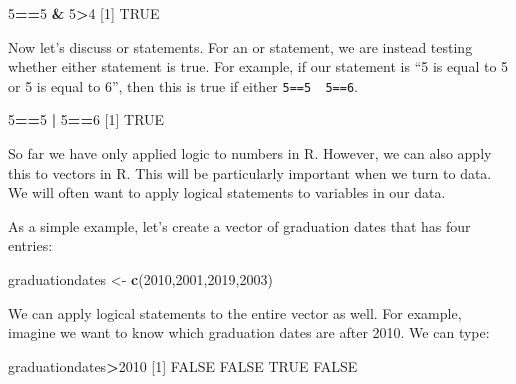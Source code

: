 \documentclass[
]{book}
\newenvironment{Shaded}{\begin{snugshade}}{\end{snugshade}}
\newcommand{\ConstantTok}[1]{\textcolor[rgb]{0.56,0.35,0.01}{#1}}
\newcommand{\DecValTok}[1]{\textcolor[rgb]{0.00,0.00,0.81}{#1}}
\newcommand{\FunctionTok}[1]{\textcolor[rgb]{0.13,0.29,0.53}{\textbf{#1}}}
\newcommand{\NormalTok}[1]{#1}
\newcommand{\OtherTok}[1]{\textcolor[rgb]{0.56,0.35,0.01}{#1}}
\newcommand{\SpecialCharTok}[1]{\textcolor[rgb]{0.81,0.36,0.00}{\textbf{#1}}}
\begin{document}
\begin{Shaded}
\begin{Highlighting}[]
\DecValTok{5}\SpecialCharTok{==}\DecValTok{5} \SpecialCharTok{\&} \DecValTok{5}\SpecialCharTok{\textgreater{}}\DecValTok{4}
\NormalTok{[}\DecValTok{1}\NormalTok{] }\ConstantTok{TRUE}
\end{Highlighting}
\end{Shaded}

Now let's discuss or statements. For an or statement, we are instead testing whether either statement is true. For example, if our statement is ``5 is equal to 5 or 5 is equal to 6'', then this is true if either \texttt{5==5\ \textbar{}\ 5==6}.

\begin{Shaded}
\begin{Highlighting}[]
\DecValTok{5}\SpecialCharTok{==}\DecValTok{5} \SpecialCharTok{|} \DecValTok{5}\SpecialCharTok{==}\DecValTok{6}
\NormalTok{[}\DecValTok{1}\NormalTok{] }\ConstantTok{TRUE}
\end{Highlighting}
\end{Shaded}

So far we have only applied logic to numbers in R. However, we can also apply this to vectors in R. This will be particularly important when we turn to data. We will often want to apply logical statements to variables in our data.

As a simple example, let's create a vector of graduation dates that has four entries:

\begin{Shaded}
\begin{Highlighting}[]
\NormalTok{graduationdates }\OtherTok{\textless{}{-}} \FunctionTok{c}\NormalTok{(}\DecValTok{2010}\NormalTok{,}\DecValTok{2001}\NormalTok{,}\DecValTok{2019}\NormalTok{,}\DecValTok{2003}\NormalTok{)}
\end{Highlighting}
\end{Shaded}

We can apply logical statements to the entire vector as well. For example, imagine we want to know which graduation dates are after 2010. We can type:

\begin{Shaded}
\begin{Highlighting}[]
\NormalTok{graduationdates}\SpecialCharTok{\textgreater{}}\DecValTok{2010}
\NormalTok{[}\DecValTok{1}\NormalTok{] }\ConstantTok{FALSE} \ConstantTok{FALSE}  \ConstantTok{TRUE} \ConstantTok{FALSE}
\end{Highlighting}
\end{Shaded}
\end{document}
